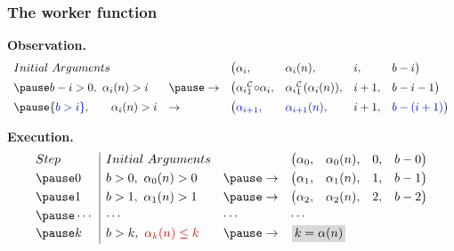 \begin{frame}
\frametitle{The worker function}

\pause
\textbf{Observation.}
\begin{equation*}
\begin{array}{lllllll}
Initial \ Arguments & & \big(\alpha_i, & \alpha_i(n), & i, & b - i \big) \\[5pt]
\pause
b - i > 0, \ \alpha_i(n) > i & \pause \to & \big(\cdt{\alpha_i}{1}\circ \alpha_i, & \cdt{\alpha_i}{1}(\alpha_i(n)), & i + 1, & b - i - 1\big) \\[5pt]
\pause
{\color{blue} b > i}, \ \hspace{15pt} \alpha_i(n) > i & \to  & \big({\color{blue} \alpha_{i+1}}, & {\color{blue} \alpha_{i+1}(n)}, & i + 1, & {\color{blue} b - (i + 1)}\big) \\
\end{array}
\end{equation*}

\pause
\textbf{Execution.}
\begin{equation*}
\begin{array}{l|lllllll}
Step & Initial \ Arguments &  &  \big(\alpha_0, & \alpha_0(n), & 0, & b - 0 \big) \\[3pt]
\pause
0 & b > 0, \ \alpha_0(n) > 0 & \pause \to & \big(\alpha_1, & \alpha_1(n), & 1, & b - 1\big) \\[3pt]
\pause
1 & b > 1, \ \alpha_1(n) > 1 & \pause \to  & \big(\alpha_2, & \alpha_2(n), & 2, & b - 2\big) \\[3pt]
\pause
\cdots & \cdots & \cdots & \multicolumn{4}{l}{\cdots} \\
\pause
k & b > k, \ {\color{red} \alpha_{k}(n) \le k} & \pause \to  & \multicolumn{4}{l}{\impinline{$k = \alpha(n)$}}
\end{array}
\end{equation*}
\end{frame}



